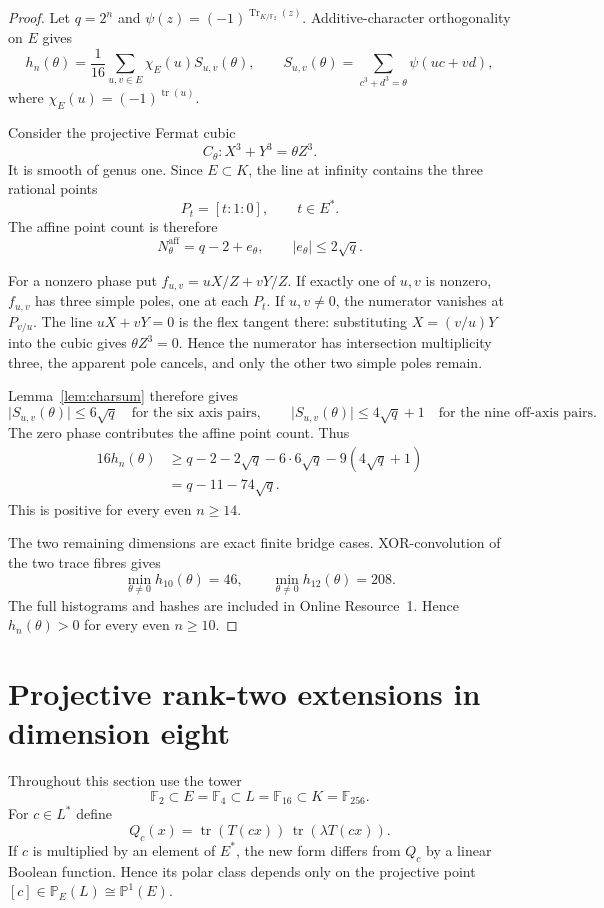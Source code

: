 \documentclass[pdflatex,sn-mathphys-num]{sn-jnl}
\theoremstyle{thmstyleone}
\theoremstyle{thmstyletwo}
\theoremstyle{thmstylethree}
\newcommand{\F}{\mathbb F}
\newcommand{\Tr}{\operatorname{Tr}}
\newcommand{\tr}{\operatorname{tr}}
\newcommand{\trchar}{\chi_E}
\newcommand{\abs}[1]{\lvert#1\rvert}
\begin{document}
\begin{proof}
Let $q=2^n$ and $\psi(z)=(-1)^{\Tr_{K/\F_2}(z)}$.  Additive-character orthogonality on $E$ gives
\begin{equation}\label{eq:char-expansion}
 h_n(\theta)=\frac1{16}\sum_{u,v\in E}\trchar(u)S_{u,v}(\theta),
 \qquad
 S_{u,v}(\theta)=\sum_{c^3+d^3=\theta}\psi(uc+vd),
\end{equation}
where $\trchar(u)=(-1)^{\tr(u)}$.

Consider the projective Fermat cubic
\[
 C_\theta:X^3+Y^3=\theta Z^3.
\]
It is smooth of genus one.  Since $E\subset K$, the line at infinity contains the three rational points
\[
 P_t=[t:1:0],\qquad t\in E^*.
\]
The affine point count is therefore
\[
 N^{\mathrm{aff}}_\theta=q-2+e_\theta,
 \qquad \abs{e_\theta}\le2\sqrt q.
\]

For a nonzero phase put $f_{u,v}=uX/Z+vY/Z$.  If exactly one of $u,v$ is nonzero, $f_{u,v}$ has three simple poles, one at each $P_t$.  If $u,v\ne0$, the numerator vanishes at $P_{v/u}$.  The line $uX+vY=0$ is the flex tangent there: substituting $X=(v/u)Y$ into the cubic gives $\theta Z^3=0$.  Hence the numerator has intersection multiplicity three, the apparent pole cancels, and only the other two simple poles remain.

Lemma~\ref{lem:charsum} therefore gives
\[
 \abs{S_{u,v}(\theta)}\le6\sqrt q
 \quad\text{for the six axis pairs},\qquad
 \abs{S_{u,v}(\theta)}\le4\sqrt q+1
 \quad\text{for the nine off-axis pairs}.
\]
The zero phase contributes the affine point count.  Thus
\begin{align*}
 16h_n(\theta)
 &\ge q-2-2\sqrt q-6\cdot6\sqrt q-9(4\sqrt q+1)\\
 &=q-11-74\sqrt q.
\end{align*}
This is positive for every even $n\ge14$.

The two remaining dimensions are exact finite bridge cases.  XOR-convolution of the two trace fibres gives
\[
 \min_{\theta\ne0}h_{10}(\theta)=46,
 \qquad
 \min_{\theta\ne0}h_{12}(\theta)=208.
\]
The full histograms and hashes are included in Online Resource~1.  Hence $h_n(\theta)>0$ for every even $n\ge10$.
\end{proof}

\section{Projective rank-two extensions in dimension eight}\label{sec:projective}

Throughout this section use the tower
\[
 \F_2\subset E=\F_4\subset L=\F_{16}\subset K=\F_{256}.
\]
For $c\in L^*$ define
\begin{equation}\label{eq:Qc}
 Q_c(x)=\tr(T(cx))\,\tr(\lambda T(cx)).
\end{equation}
If $c$ is multiplied by an element of $E^*$, the new form differs from $Q_c$ by a linear Boolean function.  Hence its polar class depends only on the projective point $[c]\in\mathbb P_E(L)\cong\mathbb P^1(E)$.
\end{document}
